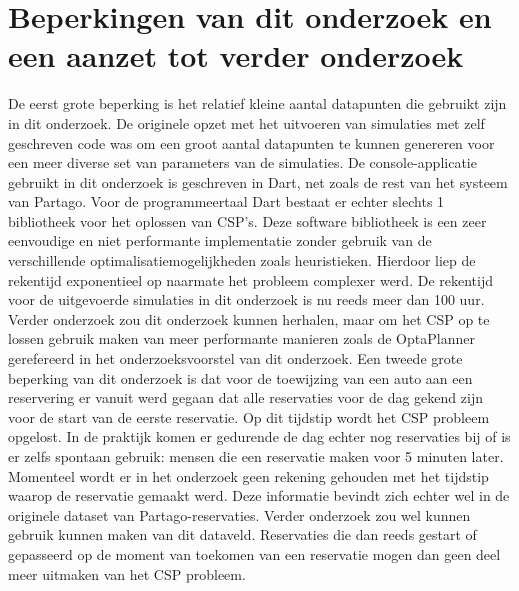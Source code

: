 \section{Beperkingen van dit onderzoek en een aanzet tot verder onderzoek} \label{beperkingen-onderzoek}
De eerst grote beperking is het relatief kleine aantal datapunten die gebruikt zijn in dit onderzoek. De originele opzet met het uitvoeren van simulaties met zelf geschreven code was om een groot aantal datapunten te kunnen genereren voor een meer diverse set van parameters van de simulaties. De console-applicatie gebruikt in dit onderzoek is geschreven in Dart, net zoals de rest van het systeem van Partago. Voor de programmeertaal Dart bestaat er echter slechts 1 bibliotheek voor het oplossen van CSP's. Deze software bibliotheek is een zeer eenvoudige en niet performante implementatie zonder gebruik van de verschillende optimalisatiemogelijkheden zoals heuristieken. Hierdoor liep de rekentijd exponentieel op naarmate het probleem complexer werd. De rekentijd voor de uitgevoerde simulaties in dit onderzoek is nu reeds meer dan 100 uur. Verder onderzoek zou dit onderzoek kunnen herhalen, maar om het CSP op te lossen gebruik maken van meer performante manieren zoals de OptaPlanner gerefereerd in het onderzoeksvoorstel van dit onderzoek. 
Een tweede grote beperking van dit onderzoek is dat voor de toewijzing van een auto aan een reservering er vanuit werd gegaan dat alle reservaties voor de dag gekend zijn voor de start van de eerste reservatie. Op dit tijdstip wordt het CSP probleem opgelost. In de praktijk komen er gedurende de dag echter nog reservaties bij of is er zelfs spontaan gebruik: mensen die een reservatie maken voor 5 minuten later. Momenteel wordt er in het onderzoek geen rekening gehouden met het tijdstip waarop de reservatie gemaakt werd. Deze informatie bevindt zich echter wel in de originele dataset van Partago-reservaties. Verder onderzoek zou wel kunnen gebruik kunnen maken van dit dataveld. Reservaties die dan reeds gestart of gepasseerd op de moment van toekomen van een reservatie mogen dan geen deel meer uitmaken van het CSP probleem.    

